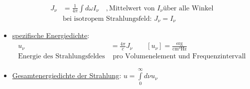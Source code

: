 \begin{itemize}[label={$\to$}]
\begin{align*}
J_\nu&=\frac{1}{4\pi}\int d\omega I_\nu \quad , \text{Mittelwert von } I_\nu \text{über alle Winkel}\\
&\text{bei isotropem Strahlungsfeld: } J_\nu=I_\nu
\end{align*}
\item \underline{spezifische Energiedichte}:
\begin{align*}
u_\nu &= \frac{4\pi}{c}J_\nu \qquad [u_\nu]=\frac{\text{erg}}{\si{\cm^3\hertz}}\\
\text{Energie des Strahlungsfeldes}&\text{ pro Volumenelement und Frequenzintervall}
\end{align*}
\item \underline{Gesamtenergiedichte der Strahlung}: $u=\int\limits_0^\infty d\nu u_\nu$
\end{itemize}
